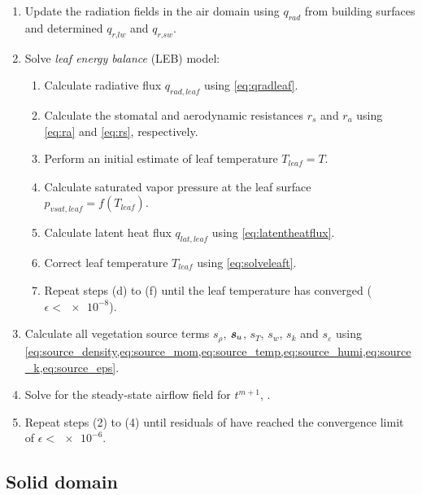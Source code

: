 \begin{enumerate}
	\item Update the radiation fields in the air domain using $q_{\textit{rad}}$ from building surfaces and determined $q_{\textit{r,lw}}$ and $q_{\textit{r,sw}}$.
	\item Solve \textit{leaf energy balance} (LEB) model:
	\begin{enumerate}
		\item Calculate radiative flux $q_{\mathit{rad,leaf}}$ using \cref{eq:qradleaf}.
		\item Calculate the stomatal and aerodynamic resistances $r_{s}$ and $r_{a}$ using \cref{eq:ra} and \cref{eq:rs}, respectively.
		\item Perform an initial estimate of leaf temperature $T_{\mathit{leaf}}=T$.
		\item Calculate saturated vapor pressure at the leaf surface $p_{\mathit{vsat,leaf}}=f(T_{\mathit{leaf}})$.
		\item Calculate latent heat flux $q_{\mathit{lat,leaf}}$ using \cref{eq:latentheatflux}. 
		\item Correct leaf temperature $T_{\mathit{leaf}}$ using \cref{eq:solveleaft}.
		\item Repeat steps (d) to (f) until the leaf temperature has converged ($\epsilon < \num{e-8}$).
	\end{enumerate}
	\item Calculate all vegetation source terms $s_\rho$, $\textbf{\textit{s}}_u$, $s_T$, $s_w$, $s_k$ and $s_{\varepsilon}$ using \cref{eq:source_density,eq:source_mom,eq:source_temp,eq:source_humi,eq:source_k,eq:source_eps}.
	\item Solve for the steady-state airflow field for $t^{m+1}$, .
	\item Repeat steps (2) to (4) until residuals of  have reached the convergence limit of $\epsilon < \num{e-6}$.
\end{enumerate}

\subsection{Solid domain}

